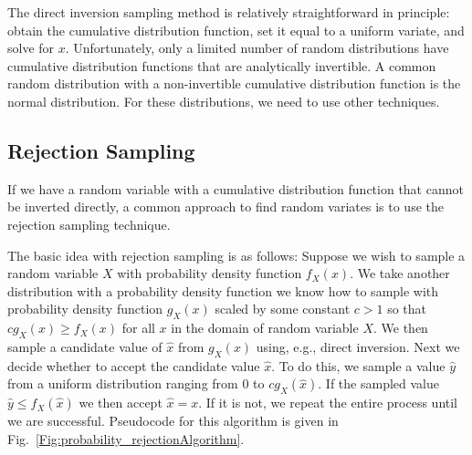 The direct inversion sampling method is relatively straightforward in principle: obtain the cumulative distribution function, set it equal to a uniform variate, and solve for $x$. Unfortunately, only a limited number of random distributions have cumulative distribution functions that are analytically invertible. A common random distribution with a non-invertible cumulative distribution function is the normal distribution. For these distributions, we need to use other techniques.


\subsection{Rejection Sampling}

If we have a random variable with a cumulative distribution function that cannot be inverted directly, a common approach to find random variates is to use the rejection sampling technique. 

The basic idea with rejection sampling is as follows: Suppose we wish to sample a random variable $X$ with probability density function $f_X(x)$. We take another distribution with a probability density function we know how to sample with probability density function $g_X(x)$ scaled by some constant $c > 1$ so that $c g_X(x) \ge f_X(x)$ for all $x$ in the domain of random variable $X$. We then sample a candidate value of $\hat{x}$ from $g_X(x)$ using, e.g., direct inversion. Next we decide whether to accept the candidate value $\hat{x}$. To do this, we sample a value $\hat{y}$ from a uniform distribution ranging from 0 to $c g_X(\hat{x})$. If the sampled value $\hat{y} \le f_X(\hat{x})$ we then accept $\hat{x} = x$. If it is not, we repeat the entire process until we are successful. Pseudocode for this algorithm is given in Fig.~\ref{Fig:probability_rejectionAlgorithm}.

